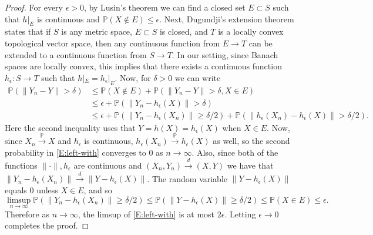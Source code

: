 \documentclass[11pt]{article}
\newcommand{\ep}{\epsilon}
\newcommand{\de}{\delta}
\newcommand{\cvgd}{\stackrel{d}{\to}}
\newcommand{\cvgp}{\stackrel{\mathbb{P}}{\to}}
\renewcommand{\P}{\mathbb{P}}
\theoremstyle{definition} %
\theoremstyle{remark} %
\begin{document}
\begin{proof}
	For every $\ep > 0$, by Lusin's theorem we can find a closed set $E \subset S$ such that $h|_E$ is continuous and $\P(X \notin E) \le \ep$. Next, Dugundji's extension theorem \cite{dugundji1951extension} states that if $S$ is any metric space, $E \subset S$ is closed, and $T$ is a locally convex topological vector space, then any continuous function from $E \to T$ can be extended to a continuous function from $S \to T$. In our setting, since Banach spaces are locally convex, this implies that there exists a continuous function $h_\ep:S \to T$ such that $h|_E = h_\ep|_E$. 
	Now, for $\de > 0$ we can write
	\begin{align}
	\nonumber
	\P(\|Y_n -Y\| > \de) &\le \P(X \notin E) + \P(\|Y_n - Y\| > \de, X \in E) \\
	\nonumber
	&\le \ep + \P(\|Y_n - h_\ep(X)\| > \de) \\
	\label{E:left-with}
	&\le \ep + \P(\|Y_n - h_\ep(X_n)\| \ge \de/2) + \P(\|h_\ep(X_n)- h_\ep(X)\| > \de/2).
	\end{align}
	Here the second inequality uses that $Y = h(X) = h_\ep(X)$ when $X \in E$. Now, since $X_n \cvgp X$ and $h_\ep$ is continuous, $h_\ep(X_n) \cvgp h_\ep(X)$ as well, so the second probability in \eqref{E:left-with} converges to $0$ as $n \to \infty$. Also, since both of the functions $\|\cdot\|, h_\ep$ are continuous and $(X_n, Y_n) \cvgd (X, Y)$ we have that $\|Y_n - h_\ep(X_n)\| \cvgd \|Y -h_\ep(X)\|$. The random variable $\|Y -h_\ep(X)\|$ equals $0$ unless $X \in E$, and so 
	$$
	\limsup_{n \to \infty} \P(\|Y_n- h_\ep(X_n)\| \ge \de/2) \le \P(\|Y - h_\ep(X)\| \ge \de/2) \le \P(X \in E) \le \ep.
	$$
	Therefore as $n \to \infty$, the limsup of \eqref{E:left-with} is at most $2 \ep$. Letting $\ep \to 0$ completes the proof.
\end{proof}
\end{document}
